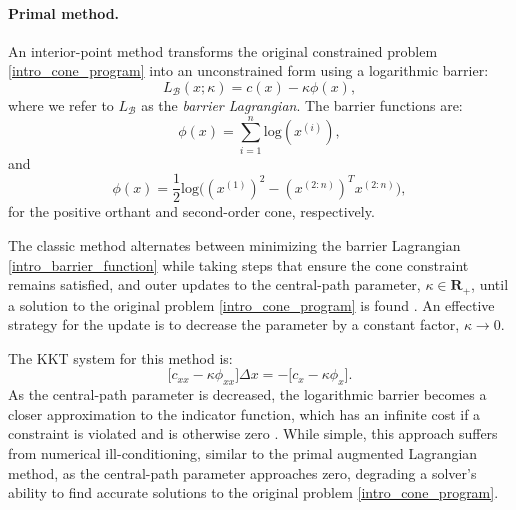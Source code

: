 \paragraph{Primal method.}
An interior-point method transforms the original constrained problem  \eqref{intro_cone_program} into an unconstrained form using a logarithmic barrier:
\begin{equation}
	L_{\mathcal{B}}(x; \kappa) = c(x) - \kappa \phi(x),
	\label{intro_barrier_function}
\end{equation}
where we refer to $L_{\mathcal{B}}$ as the \textit{barrier Lagrangian}. The barrier functions are:
\begin{equation}
	\phi(x) = \sum \limits_{i = 1}^n \mbox{log}(x^{(i)}),
\end{equation}
and 
\begin{equation}
	\phi(x) = \frac{1}{2} \mbox{log}\Big((x^{(1)})^2 - (x^{(2:n)})^T x^{(2:n)} \Big),
\end{equation}
for the positive orthant and second-order cone, respectively.

The classic method alternates between minimizing the barrier Lagrangian \eqref{intro_barrier_function} while taking steps that ensure the cone constraint remains satisfied, and outer updates to the central-path parameter, $\kappa \in \mathbf{R}_{+}$, until a solution to the original problem \eqref{intro_cone_program} is found \cite{boyd2004convex}. An effective strategy for the update is to decrease the parameter by a constant factor, $\kappa \rightarrow 0$. 

The KKT system for this method is:
\begin{equation}
	\Big[c_{xx} - \kappa \phi_{xx} \Big] \Delta x = -\Big[c_x - \kappa \phi_x \Big]. \label{intro_barrier_gradient}
\end{equation}
As the central-path parameter is decreased, the logarithmic barrier becomes a closer approximation to the indicator function, which has an infinite cost if a constraint is violated and is otherwise zero \cite{boyd2004convex}. While simple, this approach suffers from numerical ill-conditioning, similar to the primal augmented Lagrangian method, as the central-path parameter approaches zero, degrading a solver's ability to find accurate solutions to the original problem \eqref{intro_cone_program}.

